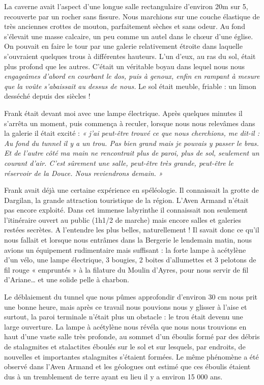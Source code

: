 


La caverne avait l’aspect d’une longue salle rectangulaire d’environ 20m sur 5, recouverte par
un rocher sans fissure. Nous marchions sur une couche élastique de très anciennes crottes de
mouton, parfaitement sèches et sans odeur. Au fond s’élevait une masse calcaire, un peu
comme un autel dans le chœur d’une église.
On pouvait en faire le tour par une galerie relativement étroite dans laquelle s’ouvraient
quelques trous à différentes hauteurs. L’un d’eux, au ras du sol, était plus profond que les
autres. C’était un véritable boyau dans lequel nous nous \textit{engageâmes d’abord en courbant le dos,
puis à genoux, enfin en rampant à mesure que la voûte s’abaissait au dessus de nous.} Le sol
était meuble, friable : un limon desséché depuis des siècles !

Frank était devant moi avec une lampe électrique. Après quelques minutes il s’arrêta un
moment, puis commença à reculer, lorsque nous nous relevâmes dans la galerie il était excité :
\textit{« j’ai peut-être trouvé ce que nous cherchions, me dit-il : Au fond du tunnel il y a un trou.
Pas bien grand mais je pouvais y passer le bras. Et de l’autre côté ma main ne rencontrait
plus de paroi, plus de sol, seulement un courant d’air. C’est sûrement une salle, peut-être
très grande, peut-être le réservoir de la Douce. Nous reviendrons demain. »}

Frank avait déjà une certaine expérience en spéléologie. Il connaissait la grotte de Dargilan, la
grande attraction touristique de la région. L’Aven Armand n’était pas encore exploité. Dans
cet immense labyrinthe il connaissait non seulement l’itinéraire ouvert au public (1h1/2 de
marche) mais encore salles et galeries restées secrètes. A l’entendre les plus belles,
naturellement ! Il savait donc ce qu’il nous fallait et lorsque nous entrâmes dans la Bergerie le
lendemain matin, nous avions un équipement rudimentaire mais suffisant : la forte lampe à
acétylène d’un vélo, une lampe électrique, 3 bougies, 2 boites d’allumettes et 3 pelotons de fil
rouge « empruntés » à la filature du Moulin d’Ayres, pour nous servir de fil d’Ariane… et une
solide pelle à charbon.

Le déblaiement du tunnel que nous pûmes approfondir d’environ 30 cm nous prit une bonne
heure, mais après ce travail nous pouvions nous y glisser à l’aise et surtout, la paroi terminale
n’était plus un obstacle : le trou était devenu une large ouverture. La lampe à acétylène nous
révéla que nous nous trouvions en haut d’une vaste salle très profonde, au sommet d’un
éboulis formé par des débris de stalagmites et stalactites éboulés sur le sol et sur lesquels, par
endroits, de nouvelles et importantes stalagmites s’étaient formées. Le même phénomène a été
observé dans l’Aven Armand et les géologues ont estimé que ces éboulis étaient dus à un
tremblement de terre ayant eu lieu il y a environ 15 000 ans.

